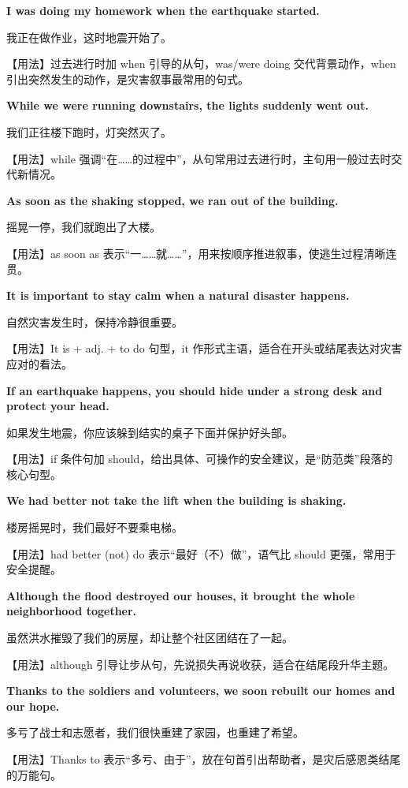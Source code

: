 \documentclass[UTF8,a4paper,11pt,oneside]{ctexbook}
\newcommand{\fansection}[1]{%
  \par\addvspace{2.4ex}%
  \Needspace{6\baselineskip}%
  \noindent{\sffamily\Large\bfseries\color{mainblue}#1}\par
  \nopagebreak
  \addvspace{0.2ex}%
  \noindent{\color{rulelight}\rule{\linewidth}{0.9pt}}\par
  \addvspace{0.9ex}%
  \nobreak
}
\newcommand{\fanpat}[3]{%
  \item{\bfseries #1}\par\nopagebreak
  {\small\color{textgray}#2}\par\nopagebreak
  {\footnotesize\color{accent!90!black}【用法】#3}\par
}
\begin{document}
\fansection{〇、本单元写作常用句型}
\begin{fanpatterns}
\fanpat{I was doing my homework when the earthquake started.}{我正在做作业，这时地震开始了。}{过去进行时加 when 引导的从句，was/were doing 交代背景动作，when 引出突然发生的动作，是灾害叙事最常用的句式。}

\fanpat{While we were running downstairs, the lights suddenly went out.}{我们正往楼下跑时，灯突然灭了。}{while 强调“在……的过程中”，从句常用过去进行时，主句用一般过去时交代新情况。}

\fanpat{As soon as the shaking stopped, we ran out of the building.}{摇晃一停，我们就跑出了大楼。}{as soon as 表示“一……就……”，用来按顺序推进叙事，使逃生过程清晰连贯。}

\fanpat{It is important to stay calm when a natural disaster happens.}{自然灾害发生时，保持冷静很重要。}{It is + adj. + to do 句型，it 作形式主语，适合在开头或结尾表达对灾害应对的看法。}

\fanpat{If an earthquake happens, you should hide under a strong desk and protect your head.}{如果发生地震，你应该躲到结实的桌子下面并保护好头部。}{if 条件句加 should，给出具体、可操作的安全建议，是“防范类”段落的核心句型。}

\fanpat{We had better not take the lift when the building is shaking.}{楼房摇晃时，我们最好不要乘电梯。}{had better (not) do 表示“最好（不）做”，语气比 should 更强，常用于安全提醒。}

\fanpat{Although the flood destroyed our houses, it brought the whole neighborhood together.}{虽然洪水摧毁了我们的房屋，却让整个社区团结在了一起。}{although 引导让步从句，先说损失再说收获，适合在结尾段升华主题。}

\fanpat{Thanks to the soldiers and volunteers, we soon rebuilt our homes and our hope.}{多亏了战士和志愿者，我们很快重建了家园，也重建了希望。}{Thanks to 表示“多亏、由于”，放在句首引出帮助者，是灾后感恩类结尾的万能句。}

\end{fanpatterns}

\fansection{一、满分范文}
\end{document}
